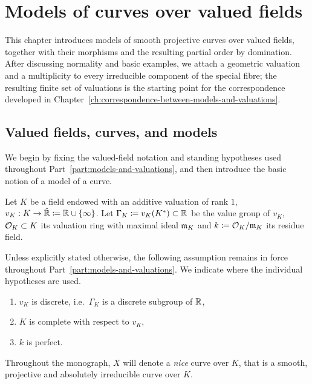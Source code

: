 

\chapter{Models of curves over valued fields}\label{ch:models-of-curves-over-valued-fields}

This chapter introduces models of smooth projective curves over valued fields, together with their morphisms and the resulting partial order by domination.
After discussing normality and basic examples, we attach a geometric valuation and a multiplicity to every irreducible component of the special fibre; the resulting finite set of valuations is the starting point for the correspondence developed in Chapter~\ref{ch:correspondence-between-models-and-valuations}.

\section{Valued fields, curves, and models}\label{sec:valued-fields-curves-and-models}
We begin by fixing the valued-field notation and standing hypotheses used throughout Part~\ref{part:models-and-valuations}, and then introduce the basic notion of a model of a curve.

Let $K$ be a field endowed with an additive valuation of rank $1$, $v_K: K \to \hat{\mathbb R} \coloneqq \mathbb R\cup \lbrace\infty\rbrace$.
Let $\Gamma_K \coloneqq v_K(K^*) \subset \mathbb R$ be the value group of $v_K$, $\mathcal O_K \subset K$ its valuation ring with
maximal ideal $\mathfrak m_K$ and $k \coloneqq \mathcal O_K /\mathfrak m_K$ its residue field.

Unless explicitly stated otherwise, the following assumption remains in force throughout Part~\ref{part:models-and-valuations}.
We indicate where the individual hypotheses are used.
\begin{assumption} \label{ass:v_K}
    \begin{enumerate}[label=\textup{(\alph*)}]
        \item $v_K$ is discrete, i.e.\ $\Gamma_K$ is a discrete subgroup of $\mathbb R$,
        \item $K$ is complete with respect to $v_K$,
        \item $k$ is perfect.
    \end{enumerate}
\end{assumption}

Throughout the monograph, $X$ will denote a \textit{nice} curve over $K$,
that is a smooth, projective and absolutely irreducible curve over $K$.

